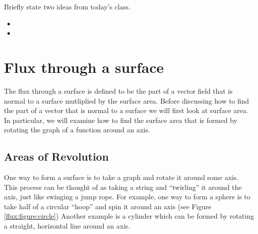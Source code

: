\postClass

\begin{problem}
\item Briefly state two ideas from today's class.
  \begin{itemize}
  \item
  \item
  \end{itemize}
\item
  \begin{subproblem}
    \item
  \end{subproblem}
\end{problem}

\clearpage

\section{Flux through a surface}
The flux through a surface is defined to be the part of a vector field
that is normal to a surface mutliplied by the surface area. Before
discussing how to find the part of a vector that is normal to a
surface we will first look at surface area. In particular, we will
examine how to find the surface area that is formed by rotating the
graph of a function around an axis.

\subsection{Areas of Revolution}
One way to form a surface is to take a graph and rotate it around some
axis. This process can be thought of as taking a string and
``twirling'' it around the axis, just like swinging a jump rope. For
example, one way to form a sphere is to take half of a circular
``hoop'' and spin it around an axis (see Figure
\ref{flux:figure:circle}) Another example is a cylinder which can be
formed by rotating a straight, horizontal line around an axis.

